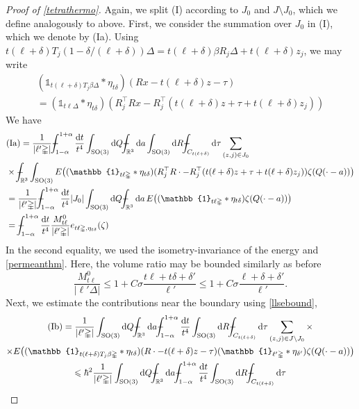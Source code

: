 \documentclass[10pt,a4paper]{amsart}
\newcommand{\RR}{\mathbb{R}}
\newcommand{\SO}{\mathrm{SO}}
\def\XXint#1#2#3{{\setbox0=\hbox{$#1{#2#3}{\int}$ }
\vcenter{\hbox{$#2#3$ }}\kern-.6\wd0}}
\def\Xint#1{\mathchoice
{\XXint\displaystyle\textstyle{#1}}%
{\XXint\textstyle\scriptstyle{#1}}%
{\XXint\scriptstyle\scriptscriptstyle{#1}}%
{\XXint\scriptscriptstyle\scriptscriptstyle{#1}}%
\!\int}
\def\dashint{\Xint-}
\newcommand{\dd}{\mathrm{d}} %
\newcommand{\iden}{\mathbb{1}} %
\renewcommand{\le}{\leqslant}
\newcommand{\tetra}{\mathbb{\Delta}} %
\begin{document}
\begin{proof}[Proof of \cref{tetrathermo}]
Again, we split (I) according to $J_0$ and $J\setminus J_0$, which we define analogously to above.
First, we consider the summation over $J_0$ in (I), which we denote by (Ia).
Using $t(\ell+\delta) T_j(1-\delta/(\ell+\delta))\tetra=t(\ell+\delta)\beta R_j\tetra + t(\ell+\delta) z_j$, we may write
\begin{multline*}
(\iden_{t(\ell+\delta) T_j\beta\tetra} * \eta_{t\delta})(Rx - t(\ell+\delta) z - \tau)\\
=(\iden_{t\ell\tetra} * \eta_{t\delta})(R_j^\top Rx - R_j^\top(t(\ell+\delta) z + \tau + t(\ell+\delta) z_j))
\end{multline*}
We have
\begin{align*}
&\mathrm{(Ia)}=\frac{1}{|\ell'\tetra|} \dashint_{1-\alpha}^{1+\alpha}\frac{\dd t}{t^4}  \int_{\SO(3)}\dd Q \dashint_{\RR^3}\dd a \int_{\SO(3)}\dd R \dashint_{C_{t(\ell+\delta)}}\dd\tau\sum_{(z,j)\in J_0}\\
	&\times \dashint_{\RR^3}\int_{\SO(3)} E\bigl((\iden_{t\ell\tetra} * \eta_{t\delta})(R_j^\top R\cdot - R_j^\top(t(\ell+\delta) z + \tau + t(\ell+\delta) z_j))\zeta(Q(\cdot - a))\bigr)\\
&=\frac{1}{|\ell'\tetra|} \dashint_{1-\alpha}^{1+\alpha}\frac{\dd t}{t^4} |J_0|
	\int_{\SO(3)}\dd Q \dashint_{\RR^3}\dd a\,  E\bigl((\iden_{t\ell\tetra} * \eta_{t\delta})\zeta( Q(\cdot- a))\bigr)\\
	&=\dashint_{1-\alpha}^{1+\alpha}\frac{\dd t}{t^4} \frac{M_{t\ell}^0}{|\ell'\tetra|} e_{t\ell\tetra,\eta_{t\delta}}(\zeta)
\end{align*}
In the second equality, we used the isometry-invariance of the energy and \cref{permeanthm}.
Here, the volume ratio may be bounded similarly as before
$$
\frac{M_{t\ell}^0}{|\ell'\tetra|}\le 1+C\sigma\frac{t\ell+t\delta+\delta'}{\ell'}\le 1+C\sigma\frac{\ell+\delta+\delta'}{\ell'}.
$$
Next, we estimate the contributions near the boundary using \cref{llsebound},
\begin{multline*}
\mathrm{(Ib)}=\frac{1}{|\ell'\tetra|}\int_{\SO(3)}\dd Q \dashint_{\RR^3}\dd a \dashint_{1-\alpha}^{1+\alpha}\frac{\dd t}{t^4} \int_{\SO(3)}\dd R \dashint_{C_{t(\ell+\delta)}}\dd\tau
\sum_{(z,j)\in J\setminus J_0} \times\\
	\times E\bigl((\iden_{t(\ell+\delta) T_j \beta\tetra} * \eta_{t\delta})(R\cdot - t(\ell+\delta) z - \tau)(\iden_{\ell'\tetra}*\eta_{\delta'})\zeta(Q(\cdot - a))\bigr)\\
\le \hbar^2\frac{1}{|\ell'\tetra|}\int_{\SO(3)}\dd Q \dashint_{\RR^3}\dd a \dashint_{1-\alpha}^{1+\alpha}\frac{\dd t}{t^4} \int_{\SO(3)}\dd R \dashint_{C_{t(\ell+\delta)}}\dd\tau

\end{multline*}
\end{proof}
\end{document}
